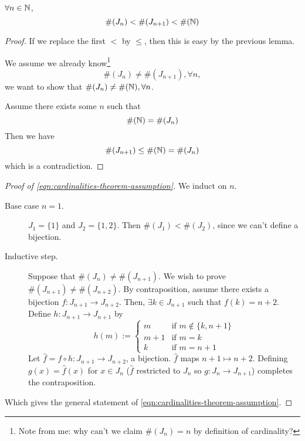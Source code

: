\begin{theorem}\label{thm:NN-countable-infinity}
    $\forall n\in \mathbb N$,
    \[\#(J_n) < \#(J_{n+1}) < \#(\mathbb N)\]
\end{theorem}
\begin{proof}
    If we replace the first $<$ by $\leq$, then this is easy by the previous lemma.

    We assume we already know\footnote{Note from me: why can't we claim $\#(J_n) = n$ by definition of cardinality?}
    \begin{equation}\label{eqn:cardinalities-theorem-assumption}
        \#(J_n)\neq \#(J_{n+1}), \forall n,
    \end{equation}
    we want to show that $\#(J_n)\neq \#(\mathbb N), \forall n$.

    Assume there exists some $n$ such that
    \[\#(\mathbb N) = \#(J_n)\]
    Then we have
    \[\#(J_{n+1})\leq \#(\mathbb N) = \#(J_n)\]
    which is a contradiction.
\end{proof}

\begin{proof}[Proof of \cref{eqn:cardinalities-theorem-assumption}]
    We induct on $n$.
    \begin{description}
        \item[Base case $n = 1$.] $J_1 = \{1\}$ and $J_2 = \{1, 2\}$. Then $\#(J_1) < \#(J_2)$, since we can't define a bijection.
        \item[Inductive step.] Suppose that $\#(J_n)\neq \#(J_{n+1})$. We wish to prove $\#(J_{n+1}) \neq \#(J_{n+2})$. By contraposition, assume there exists a bijection $f: J_{n+1}\to J_{n+2}$. Then, $\exists k\in J_{n+1}$ such that $f(k) = n + 2$. Define $h: J_{n+1}\to J_{n+1}$ by
            \[h(m) := \begin{cases}
                    m   & \text{if }m\not\in \{k, n+1\} \\
                    m+1 & \text{if }m=k                 \\
                    k   & \text{if }m = n+1
                \end{cases}\]
            Let $\hat f = f\circ h : J_{n+1} \to J_{n+2}$, a bijection. $\hat f$ maps $n+1\mapsto n+2$. Defining $g(x) = \hat f(x)$ for $x\in J_n$ ($\hat f$ restricted to $J_n$ so $g : J_n\to J_{n+1}$) completes the contraposition.
    \end{description}
    Which gives the general statement of \cref{eqn:cardinalities-theorem-assumption}.
\end{proof}

